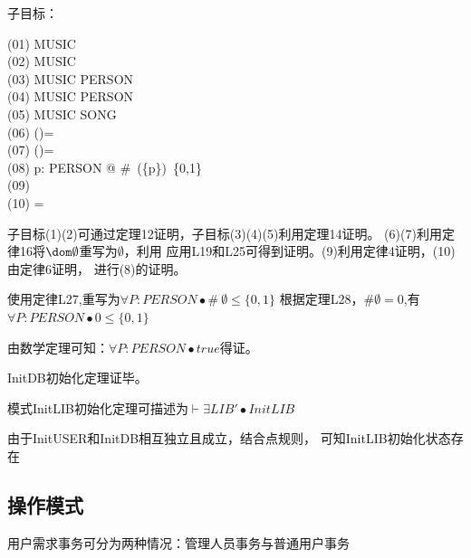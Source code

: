 \documentclass[14pt]{article}
\numberwithin{figure}{subsection}
\begin{document}
\clearpage
\begin{minipage}[t]{0.5\linewidth}
    \begin{flushleft}
        子目标：
        \vspace{-0.5cm}
        \begin{syntax}
            (01) \vDash \emptyset \in \power MUSIC \\
            (02) \vDash \emptyset \in \power MUSIC  \\
            (03) \vDash \emptyset \in \power MUSIC \pfun PERSON  \\
            (04) \vDash \emptyset \in \power MUSIC \pfun PERSON \\
            (05) \vDash \emptyset \in \power MUSIC \pfun SONG \\
            (06) \vDash (\dom \emptyset)\cup \emptyset = \emptyset \\
            (07) \vDash (\dom \emptyset)\cap \emptyset = \emptyset \\
            (08) \vDash \forall p: PERSON @ \#~(\emptyset \rres \{p\})\subseteq\ \{0,1\} \\
            (09) \vDash \emptyset \subseteq \emptyset \\
            (10) \vDash \dom \emptyset = \emptyset \\
        \end{syntax}
    \end{flushleft}
\end{minipage}
\hfill
\begin{minipage}[t]{0.45\linewidth}
    \quad 子目标(1)(2)可通过定理12证明，子目标(3)(4)(5)利用定理14证明。
    (6)(7)利用定律16将$\dom \emptyset$重写为$\emptyset$，利用
    应用L19和L25可得到证明。(9)利用定律4证明，(10)由定律6证明，
    进行(8)的证明。\par
    \quad 使用定律L27,重写为$\forall P: PERSON \bullet \#~{\emptyset}\leq \{0,1\}$
    根据定理L28，$\# \emptyset = 0$,有$\forall P:PERSON \bullet 0 \leq \{0,1\}$\par
    \quad 由数学定理可知：$\forall P: PERSON \bullet true$得证。\par
    \quad InitDB初始化定理证毕。\par
\end{minipage}

模式InitLIB初始化定理可描述为$\vdash \exists LIB' \bullet InitLIB$

由于InitUSER和InitDB相互独立且成立，结合点规则，
可知InitLIB初始化状态存在
\subsection{操作模式}
用户需求事务可分为两种情况：管理人员事务与普通用户事务
\end{document}
